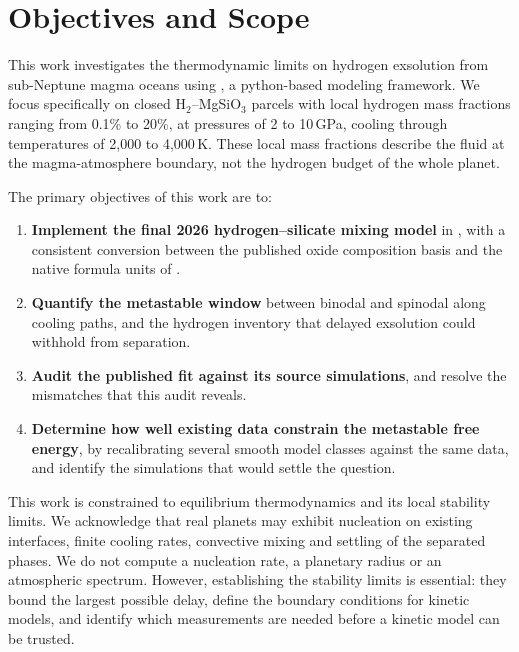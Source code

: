 \section{Objectives and Scope}

This work investigates the thermodynamic limits on hydrogen exsolution from sub-Neptune
magma oceans using \Atm{}, a python-based modeling framework. We focus specifically on
closed H$_2$--MgSiO$_3$ parcels with local hydrogen mass fractions ranging from 0.1\% to 20\%,
at pressures of 2 to 10\,GPa, cooling through temperatures of 2,000 to 4,000\,K. These local
mass fractions describe the fluid at the magma-atmosphere boundary, not the hydrogen budget
of the whole planet.

The primary objectives of this work are to:
\begin{enumerate}
\item \textbf{Implement the final 2026 hydrogen--silicate mixing model} \cite{gilmore2026} in
\Atm{}, with a consistent conversion between the published oxide composition basis and the
native formula units of \Atm{}.
\item \textbf{Quantify the metastable window} between binodal and spinodal along cooling
paths, and the hydrogen inventory that delayed exsolution could withhold from separation.
\item \textbf{Audit the published fit against its source simulations}, and resolve the
mismatches that this audit reveals.
\item \textbf{Determine how well existing data constrain the metastable free energy}, by
recalibrating several smooth model classes against the same data, and identify the
simulations that would settle the question.
\end{enumerate}

This work is constrained to equilibrium thermodynamics and its local stability limits. We
acknowledge that real planets may exhibit nucleation on existing interfaces, finite cooling
rates, convective mixing and settling of the separated phases. We do not compute a
nucleation rate, a planetary radius or an atmospheric spectrum. However, establishing the
stability limits is essential: they bound the largest possible delay, define the boundary
conditions for kinetic models, and identify which measurements are needed before a kinetic
model can be trusted.

